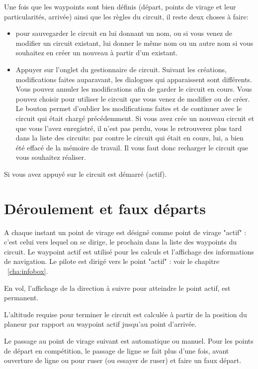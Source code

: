 Une fois que les waypoints sont bien définis (départ, points de virage et leur particularités, arrivée) ainsi que les règles du circuit, il reste deux choses à faire:
\begin{itemize}
\item  {} pour sauvegarder le circuit en lui donnant un nom, ou si vous venez de modifier un circuit existant, lui donner le même nom ou un autre nom si vous souhaitez en créer un nouveau à partir d'un existant.
\item Appuyer sur l'onglet   du gestionnaire de circuit. Suivant les créations, modifications faites auparavant, les dialogues qui apparaissent sont différents. Vous pouvez annuler les modifications afin de garder le circuit en cours. Vous pouvez choisir   pour utiliser le circuit que vous venez de modifier ou de créer. Le bouton   permet d'oublier les modifications faites et de continuer avec le circuit qui était chargé précédemment. Si vous avez crée un nouveau circuit et que vous l'avez enregistré, il n'est pas perdu, vous le retrouverez plus tard dans la liste des circuits: par contre le circuit qui était en cours, lui, a bien été effacé de la mémoire de travail. Il vous faut donc recharger le circuit que vous souhaitez réaliser.
 \end{itemize}

Si vous avez appuyé sur   le circuit est démarré (actif).

\section{Déroulement et faux départs}\label{sec:advanc-rest-tasks}
A chaque instant un point de virage est désigné comme point de virage "actif" : c'est celui vers lequel on se dirige, le prochain dans la liste des waypoints du circuit. Le waypoint actif est utilisé pour les calculs et l'affichage des informations de navigation. Le pilote est dirigé vers le point "actif" : voir le chapitre ~\ref{cha:infobox}.

En vol, l'affichage de la direction à suivre pour atteindre le point actif, est permanent.

L'altitude requise pour terminer le circuit est calculée à partir de la position du planeur par rapport au waypoint actif jusqu'au point d'arrivée.

Le passage au point de virage suivant est automatique ou manuel. 
Pour les points de départ en compétition, le passage de ligne se fait plus d'une fois, avant ouverture de ligne ou pour ruser (ou essayer de ruser) et faire un faux départ.

